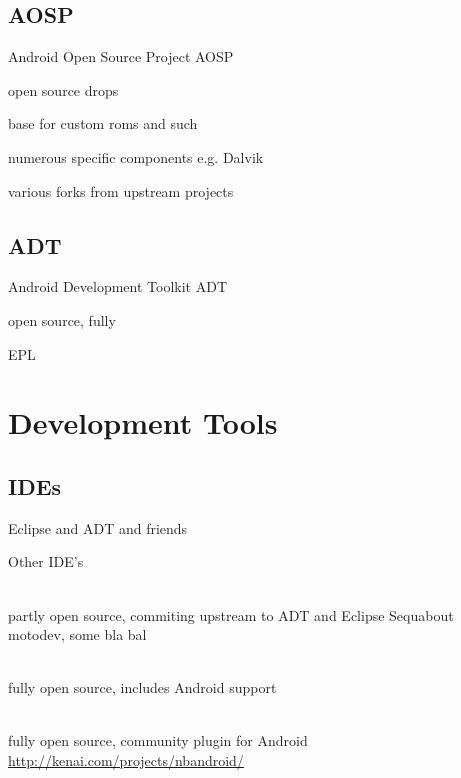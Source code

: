 \documentclass[aspectratio=169]{beamer}
\newcommand{\surl}[1] {{\tiny \url{#1}}}
\begin{document}
  \subsection{AOSP}
    \begin{frame}{Android Open Source Project AOSP}
      \begin{description}
        \item<1->open source drops
        \item<2->base for custom roms and such
        \item<3->numerous specific components e.g. Dalvik
        \item<4->various forks from upstream projects
      \end{description}
    \end{frame}

  \subsection{ADT}
    \begin{frame}{Android Development Toolkit ADT}
      \begin{description}
        \item<1->open source, fully 
        \item<2->EPL
      \end{description}
    \end{frame}

\section{Development Tools}

  \subsection{IDEs}

    \begin{frame}{Eclipse and ADT and friends}
      
    \end{frame}

    \begin{frame}{Other IDE's}
      \begin{description}
       \item<1->[Motorola Motodev Studio for Android] \hfill \\  partly open source, commiting upstream to ADT and Eclipse Sequabout motodev, some bla bal
\item<2->[Jetbrains IntelliJ IDEA CE] \hfill \\ fully open source, includes Android support
        \item<3->[Oracle Netbeans] \hfill \\ fully open source, community plugin for Android
\surl{http://kenai.com/projects/nbandroid/}
\end{description}

    \end{frame}
\end{document}
